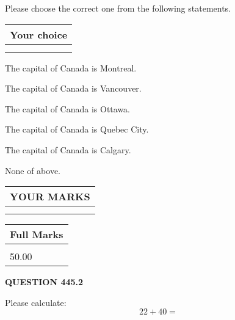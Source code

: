 \documentclass[12pt]{article}
\begin{document}
  
Please choose the correct one from the following statements.
  
  
\noindent\hspace{3.0in} \begin{tabular}{|l|}
\hline
Your choice \\
\hline
 \\ 
 \\ 
\hline
\end{tabular}
  
  
 
 
The capital of Canada is Montreal.
 
 
The capital of Canada is Vancouver.
 
 
The capital of Canada is Ottawa.
 
 
The capital of Canada is Quebec City.
 
 
The capital of Canada is Calgary.
 
 
 None of above.
 
 
  
\vspace{0.2in}
  
\noindent\begin{tabular}{|l|}
\hline
 YOUR MARKS  \\
\hline
 \\ 
 \\ 
\hline
\end{tabular}
\hspace{0.05in} \begin{tabular}{|l|}
\hline
 Full Marks  \\
\hline
 \\ 
50.00 \\
\hline
\end{tabular}
{\textbf{\Large{QUESTION
445.2 
}}}
  
  
 
Please calculate:
\begin{equation}
22 +  %
40 = \nonumber
\end{equation}
 

 

 
   
   
 \vspace{0.2in}
 
   
   
   
   
\end{document}
